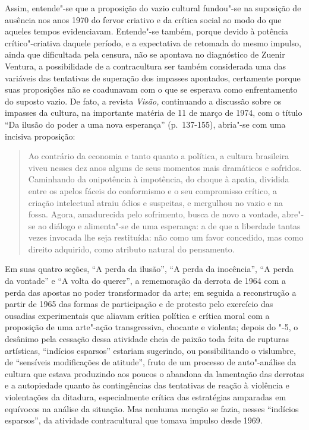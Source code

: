 Assim, entende"-se que a proposição do vazio cultural fundou"-se na
suposição de ausência nos anos 1970 do fervor criativo e da crítica
social ao modo do que aqueles tempos evidenciavam. Entende"-se também,
porque devido à potência crítico"-criativa daquele período, e a
expectativa de retomada do mesmo impulso, ainda que dificultada pela
censura, não se apontava no diagnóstico de Zuenir Ventura, a
possibilidade de a contracultura ser também considerada uma das
variáveis das tentativas de superação dos impasses apontados, certamente
porque suas proposições não se coadunavam com o que se esperava como
enfrentamento do suposto vazio. De fato, a revista \emph{Visão,}
continuando a discussão sobre os impasses da cultura, na importante
matéria de 11 de março de 1974, com o título ``Da ilusão do poder a uma
nova esperança'' (p.~137-155), abria"-se com uma incisiva proposição:

\begin{quote}
Ao contrário da economia e tanto quanto a política, a cultura brasileira
viveu nesses dez anos alguns de seus momentos mais dramáticos e
sofridos. Caminhando da onipotência à impotência, do choque à apatia,
dividida entre os apelos fáceis do conformismo e o seu compromisso
crítico, a criação intelectual atraiu ódios e suspeitas, e mergulhou no
vazio e na fossa. Agora, amadurecida pelo sofrimento, busca de novo a
vontade, abre"-se ao diálogo e alimenta"-se de uma esperança: a de que a
liberdade tantas vezes invocada lhe seja restituída: não como um favor
concedido, mas como direito adquirido, como atributo natural do
pensamento.
\end{quote}

Em suas quatro seções, ``A perda da ilusão'', ``A perda da inocência'',
``A perda da vontade'' e ``A volta do querer'', a rememoração da derrota
de 1964 com a perda das apostas no poder transformador da arte; em
seguida a reconstrução a partir de 1965 das formas de participação e de
protesto pelo exercício das ousadias experimentais que aliavam crítica
política e crítica moral com a proposição de uma arte"-ação
transgressiva, chocante e violenta; depois do "-5, o desânimo pela
cessação dessa atividade cheia de paixão toda feita de rupturas
artísticas, ``indícios esparsos'' estariam sugerindo, ou possibilitando
o vislumbre, de ``sensíveis modificações de atitude'', fruto de um
processo de auto"-análise da cultura que estava produzindo aos poucos o
abandona da lamentação das derrotas e a autopiedade quanto às
contingências das tentativas de reação à violência e violentações da
ditadura, especialmente crítica das estratégias amparadas em equívocos
na análise da situação. Mas nenhuma menção se fazia, nesses ``indícios
esparsos'', da atividade contracultural que tomava impulso desde 1969.

